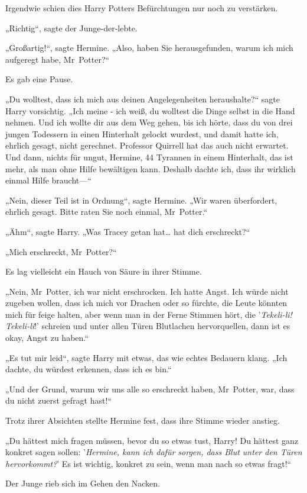 {Irgendwie schien dies Harry Potters Befürchtungen nur noch zu verstärken.

„Richtig“, sagte der Junge-der-lebte.

„Großartig!“, sagte Hermine. „Also, haben Sie herausgefunden, warum ich mich aufgeregt habe, Mr~Potter?“

Es gab eine Pause.

„Du wolltest, dass ich mich aus deinen Angelegenheiten heraushalte?“ sagte Harry vorsichtig. „Ich meine - ich weiß, du wolltest die Dinge selbst in die Hand nehmen. Und ich wollte dir aus dem Weg gehen, bis ich hörte, dass du von drei jungen Todessern in einen Hinterhalt gelockt wurdest, und damit hatte ich, ehrlich gesagt, nicht gerechnet. Professor Quirrell hat das auch nicht erwartet. Und dann, nichts für ungut, Hermine, 44 Tyrannen in einem Hinterhalt, das ist mehr, als man ohne Hilfe bewältigen kann. Deshalb dachte ich, dass ihr wirklich einmal Hilfe braucht—“

„Nein, dieser Teil ist in Ordnung“, sagte Hermine. „Wir waren überfordert, ehrlich gesagt. Bitte raten Sie noch einmal, Mr~Potter.“

„Ähm“, sagte Harry. „Was Tracey getan hat… hat dich erschreckt?“

„Mich erschreckt, Mr~Potter?“

Es lag vielleicht ein Hauch von Säure in ihrer Stimme.

„Nein, Mr~Potter, ich war nicht erschrocken. Ich hatte Angst. Ich würde nicht zugeben wollen, dass ich mich vor Drachen oder so fürchte, die Leute könnten mich für feige halten, aber wenn man in der Ferne Stimmen hört, die '\emph{Tekeli-li! Tekeli-li}!' schreien und unter allen Türen Blutlachen hervorquellen, dann ist es okay, Angst zu haben.“

„Es tut mir leid“, sagte Harry mit etwas, das wie echtes Bedauern klang. „Ich dachte, du würdest erkennen, dass ich es bin.“

„Und der Grund, warum wir uns alle so erschreckt haben, Mr~Potter, war, dass du nicht zuerst gefragt hast!“

Trotz ihrer Absichten stellte Hermine fest, dass ihre Stimme wieder anstieg.

„Du hättest mich fragen müssen, bevor du so etwas tust, Harry! Du hättest ganz konkret sagen sollen: '\emph{Hermine, kann ich dafür sorgen, dass Blut unter den Türen hervorkommt?}' Es ist wichtig, konkret zu sein, wenn man nach so etwas fragt!“

Der Junge rieb sich im Gehen den Nacken.

}
